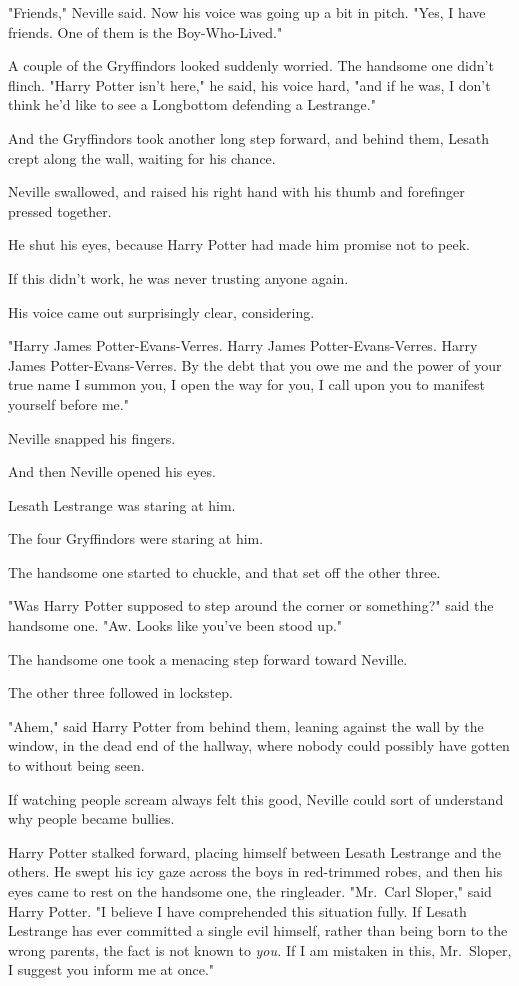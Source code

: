 "Friends," Neville said. Now his voice was going up a bit in pitch. "Yes, I 
have friends. One of them is the Boy-Who-Lived."

A couple of the Gryffindors looked suddenly worried. The handsome one didn't 
flinch. "Harry Potter isn't here," he said, his voice hard, "and if he was, I 
don't think he'd like to see a Longbottom defending a Lestrange."

And the Gryffindors took another long step forward, and behind them, Lesath 
crept along the wall, waiting for his chance.

Neville swallowed, and raised his right hand with his thumb and forefinger 
pressed together.

He shut his eyes, because Harry Potter had made him promise not to peek.

If this didn't work, he was never trusting anyone again.

His voice came out surprisingly clear, considering.

"Harry James Potter-Evans-Verres. Harry James Potter-Evans-Verres. Harry James 
Potter-Evans-Verres. By the debt that you owe me and the power of your true 
name I summon you, I open the way for you, I call upon you to manifest yourself 
before me."

Neville snapped his fingers.

And then Neville opened his eyes.

Lesath Lestrange was staring at him.

The four Gryffindors were staring at him.

The handsome one started to chuckle, and that set off the other three.

"Was Harry Potter supposed to step around the corner or something?" said the 
handsome one. "Aw. Looks like you've been stood up."

The handsome one took a menacing step forward toward Neville.

The other three followed in lockstep.

"Ahem," said Harry Potter from behind them, leaning against the wall by the 
window, in the dead end of the hallway, where nobody could possibly have gotten 
to without being seen.

If watching people scream always felt this good, Neville could sort of 
understand why people became bullies.

Harry Potter stalked forward, placing himself between Lesath Lestrange and the 
others. He swept his icy gaze across the boys in red-trimmed robes, and then 
his eyes came to rest on the handsome one, the ringleader. "Mr.~Carl Sloper," 
said Harry Potter. "I believe I have comprehended this situation fully. If 
Lesath Lestrange has ever committed a single evil himself, rather than being 
born to the wrong parents, the fact is not known to \emph{you.} If I am 
mistaken in this, Mr.~Sloper, I suggest you inform me at once."


